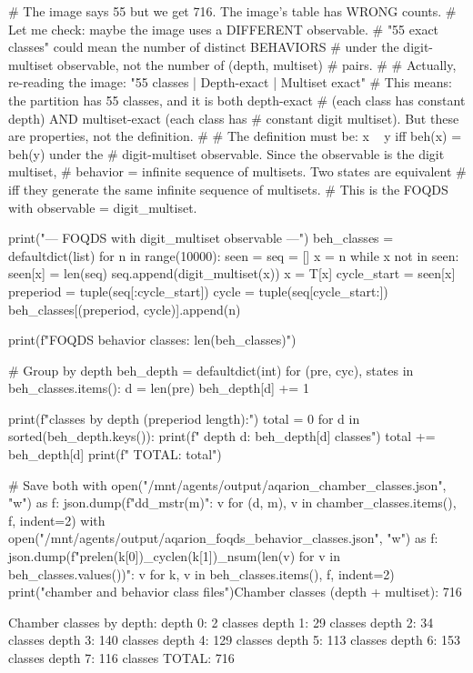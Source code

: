 {{{{{{{{{{{{{# The image says 55 but we get 716. The image's table has WRONG counts.
# Let me check: maybe the image uses a DIFFERENT observable.
# "55 exact classes" could mean the number of distinct BEHAVIORS
# under the digit-multiset observable, not the number of (depth, multiset)
# pairs.
#
# Actually, re-reading the image: "55 classes | Depth-exact | Multiset exact"
# This means: the partition has 55 classes, and it is both depth-exact
# (each class has constant depth) AND multiset-exact (each class has
# constant digit multiset). But these are properties, not the definition.
#
# The definition must be: x ~ y iff beh(x) = beh(y) under the
# digit-multiset observable. Since the observable is the digit multiset,
# behavior = infinite sequence of multisets. Two states are equivalent
# iff they generate the same infinite sequence of multisets.
# This is the FOQDS with observable = digit_multiset.

print("\n--- FOQDS with digit_multiset observable ---")
beh_classes = defaultdict(list)
for n in range(10000):
    seen = {}
    seq = []
    x = n
    while x not in seen:
        seen[x] = len(seq)
        seq.append(digit_multiset(x))
        x = T[x]
    cycle_start = seen[x]
    preperiod = tuple(seq[:cycle_start])
    cycle = tuple(seq[cycle_start:])
    beh_classes[(preperiod, cycle)].append(n)

print(f"FOQDS behavior classes: {len(beh_classes)}")

# Group by depth
beh_depth = defaultdict(int)
for (pre, cyc), states in beh_classes.items():
    d = len(pre)
    beh_depth[d] += 1

print(f"\nFOQDS classes by depth (preperiod length):")
total = 0
for d in sorted(beh_depth.keys()):
    print(f"  depth {d}: {beh_depth[d]} classes")
    total += beh_depth[d]
print(f"  TOTAL: {total}")

# Save both
with open("/mnt/agents/output/aqarion_chamber_classes.json", "w") as f:
    json.dump({f"d{d}_m{str(m)}": v for (d, m), v in chamber_classes.items()}, f, indent=2)
with open("/mnt/agents/output/aqarion_foqds_behavior_classes.json", "w") as f:
    json.dump({f"pre{len(k[0])}_cyc{len(k[1])}_n{sum(len(v) for v in beh_classes.values())}": v for k, v in beh_classes.items()}, f, indent=2)
print("\n[Saved] chamber and behavior class files")Chamber classes (depth + multiset): 716

Chamber classes by depth:
  depth 0: 2 classes
  depth 1: 29 classes
  depth 2: 34 classes
  depth 3: 140 classes
  depth 4: 129 classes
  depth 5: 113 classes
  depth 6: 153 classes
  depth 7: 116 classes
  TOTAL: 716

}}}}}}}}}}}}}
